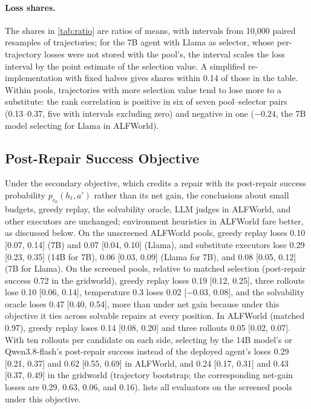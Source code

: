\documentclass{article}
\theoremstyle{plain}
\theoremstyle{definition}
\theoremstyle{remark}
\begin{document}
\paragraph{Loss shares.}
The shares in \cref{tab:ratio} are ratios of means, with intervals from 10{,}000 paired resamples of trajectories; for the 7B agent with Llama as selector, whose per-trajectory losses were not stored with the pool's, the interval scales the loss interval by the point estimate of the selection value. A simplified re-implementation with fixed halves gives shares within 0.14 of those in the table. Within pools, trajectories with more selection value tend to lose more to a substitute: the rank correlation is positive in six of seven pool--selector pairs (0.13--0.37, five with intervals excluding zero) and negative in one ($-0.24$, the 7B model selecting for Llama in ALFWorld).

\subsection{Post-Repair Success Objective}
\label{app:post}

Under the secondary objective, which credits a repair with its post-repair success probability $p_{e_0}(h_t,a')$ rather than its net gain, the conclusions about small budgets, greedy replay, the solvability oracle, LLM judges in ALFWorld, and other executors are unchanged; environment heuristics in ALFWorld fare better, as discussed below. On the unscreened ALFWorld pools, greedy replay loses 0.10 [0.07, 0.14] (7B) and 0.07 [0.04, 0.10] (Llama), and substitute executors lose 0.29 [0.23, 0.35] (14B for 7B), 0.06 [0.03, 0.09] (Llama for 7B), and 0.08 [0.05, 0.12] (7B for Llama). On the screened pools, relative to matched selection (post-repair success 0.72 in the gridworld), greedy replay loses 0.19 [0.12, 0.25], three rollouts lose 0.10 [0.06, 0.14], temperature 0.3 loses 0.02 [$-$0.03, 0.08], and the solvability oracle loses 0.47 [0.40, 0.54], more than under net gain because under this objective it ties across solvable repairs at every position. In ALFWorld (matched 0.97), greedy replay loses 0.14 [0.08, 0.20] and three rollouts 0.05 [0.02, 0.07]. With ten rollouts per candidate on each side, selecting by the 14B model's or Qwen3.8-flash's post-repair success instead of the deployed agent's loses 0.29 [0.21, 0.37] and 0.62 [0.55, 0.69] in ALFWorld, and 0.24 [0.17, 0.31] and 0.43 [0.37, 0.49] in the gridworld (trajectory bootstrap; the corresponding net-gain losses are 0.29, 0.63, 0.06, and 0.16).  lists all evaluators on the screened pools under this objective.
\end{document}
